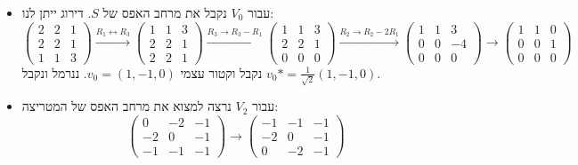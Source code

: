 \documentclass{article}
\begin{document}
\begin{itemize}
    \item עבור $V_0$ נקבל את מרחב האפס של $S$. דירוג ייתן לנו: \[
              \begin{pmatrix}
                  2 & 2 & 1 \\
                  2 & 2 & 1 \\
                  1 & 1 & 3
              \end{pmatrix} \xrightarrow[]{R_1\leftrightarrow R_3}
              \begin{pmatrix}
                  1 & 1 & 3 \\
                  2 & 2 & 1 \\
                  2 & 2 & 1
              \end{pmatrix} \xrightarrow[]{R_3\rightarrow R_3-R_1}
              \begin{pmatrix}
                  1 & 1 & 3 \\
                  2 & 2 & 1 \\
                  0 & 0 & 0
              \end{pmatrix} \xrightarrow[]{R_2\rightarrow R_2-2R_1}
              \begin{pmatrix}
                  1 & 1 & 3  \\
                  0 & 0 & -4 \\
                  0 & 0 & 0
              \end{pmatrix}\rightarrow
              \begin{pmatrix}
                  1 & 1 & 0 \\
                  0 & 0 & 1 \\
                  0 & 0 & 0
              \end{pmatrix}
          \]
          נקבל וקטור עצמי $v_0=(1,-1,0)$. ננרמל ונקבל $v_0*=\frac{1}{\sqrt{2}}(1,-1,0)$.
    \item עבור $V_2$ נרצה למצוא את מרחב האפס של המטריצה: \[
              \begin{pmatrix}
                  0  & -2 & -1 \\
                  -2 & 0  & -1 \\
                  -1 & -1 & -1
              \end{pmatrix}\rightarrow
              \begin{pmatrix}
                  -1 & -1 & -1 \\
                  -2 & 0  & -1 \\
                  0  & -2 & -1

\end{pmatrix}\]
\end{itemize}
\end{document}
